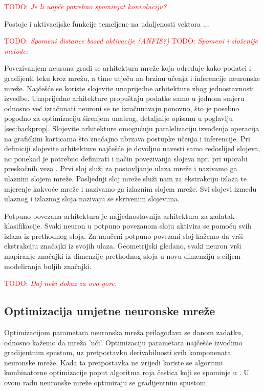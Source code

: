 \documentclass[times, utf8, diplomski]{fer}
\def\TODO#1{\noindent\textcolor{red}{TODO: \textit{#1}}\newline}
\def\todo#1{\TODO{#1}}
\begin{document}
\todo{Je li uopće potrebno spominjat konvoluciju?}

Postoje i aktivacijske funkcije temeljene na udaljenosti vektora ...

\todo{Spomeni distance based aktivacije (ANFIS?)}
\todo{Spomeni i složenije metode: \citep{network_in_network}}

Povezivanjem neurona gradi se arhitektura mreže koja određuje kako podatci i gradijenti teku kroz mrežu, a time utječu na brzinu učenja i inferencije neuronske mreže. Najčešće se koriste slojevite unaprijedne arhitekture zbog jednostavnosti izvedbe. Unaprijedne arhitekture propuštaju podatke samo u jednom smjeru odnosno već izračunati neuroni se ne izračunavaju ponovno, što je posebno pogodno za optimizaciju širenjem unatrag, detaljnije opisanu u poglavlju \ref{sec:backprop}. Slojevite arhitekture omogućuju paralelizaciju izvođenja operacija na grafičkim karticama što značajno ubrzava postupke učenja i inferencije. Pri definiciji slojevite arhitekture najčešće je dovoljno navesti samo redoslijed slojeva, no ponekad je potrebno definirati i način povezivanja slojeva npr. pri uporabi preskočnih veza \citep{highwaynet, resnet, densenet}. Prvi sloj služi za postavljanje ulaza mreže i nazivamo ga ulaznim slojem mreže. Posljednji sloj mreže služi nam za ekstrakciju izlaza te mjerenje kakvoće mreže i nazivamo ga izlaznim slojem mreže. Svi slojevi između ulaznog i izlaznog sloja nazivaju se skrivenim slojevima.

Potpuno povezana arhitektura je najjednostavnija arhitektura za zadatak klasifikacije. Svaki neuron u potpuno povezanom sloju aktivira se pomoću svih izlaza iz prethodnog sloja. Za naučeni potpuno povezani sloj kažemo da vrši ekstrakciju značajki iz svojih ulaza. Geometrijski gledano, svaki neuron vrši mapiranje značajki iz dimenzije prethodnog sloja u novu dimenziju s ciljem modeliranja boljih značajki.

\todo{Daj neki dokaz za ovo gore.}

\subsection{Optimizacija umjetne neuronske mreže}
Optimizacijom parametara neuronska mreža prilagođava se danom zadatku, odnosno kažemo da mreža 'uči'. Optimizaciju parametara najčešće izvodimo gradijentnim spustom, uz pretpostavku derivabilnosti svih komponenata neuronske mreže. Kada ta pretpostavka ne vrijedi koriste se algoritmi kombinatorne optimizacije poput algoritma roja čestica koji se spominje u \citet{skripta_nenr}. U ovom radu neuronske mreže optimiraju se gradijentnim spustom.
\end{document}
